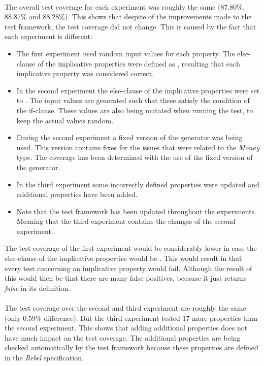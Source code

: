 \\
The overall test coverage for each experiment was roughly the same (87.80\%, 88.87\% and 88.28\%). This shows that despite of the improvements made to the test framework, the test coverage did not change. This is caused by the fact that each experiment is different:
\begin{itemize}
  \item The first experiment used random input values for each property. The else-clause of the implicative properties were defined as , resulting that each implicative property was considered correct.
  \item In the second experiment the else-clause of the implicative properties were set to . The input values are generated such that these satisfy the condition of the if-clause. These values are also being mutated when running the test, to keep the actual values random.
  \item During the second experiment a fixed version of the generator was being used. This version contains fixes for the issues that were related to the \textit{Money} type. The coverage has been determined with the use of the fixed version of the generator.
  \item In the third experiment some incorrectly defined properties were updated and additional properties have been added.
  \item Note that the test framework has been updated throughout the experiments. Meaning that the third experiment contains the changes of the second experiment.
\end{itemize}
The test coverage of the first experiment would be considerably lower in case the else-clause of the implicative properties would be . This would result in that every test concerning an implicative property would fail. Although the result of this would then be that there are many false-positives, because it just returns \textit{false} in its definition.\\
\\
The test coverage over the second and third experiment are roughly the same (only 0.59\% difference). But the third experiment tested 17 more properties than the second experiment. This shows that adding additional properties does not have much impact on the test coverage. The additional properties are being checked automatically by the test framework because these properties are defined in the \textit{Rebel} specification.


